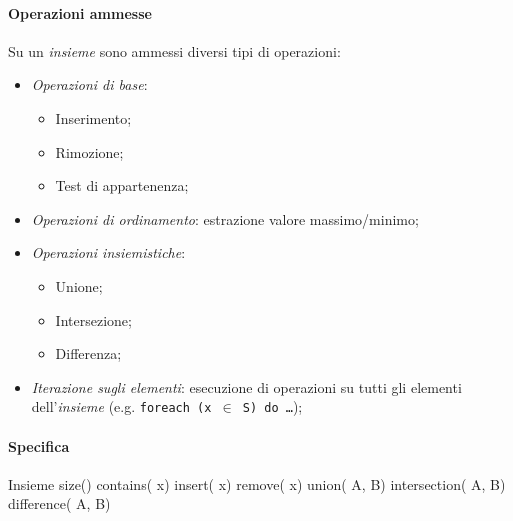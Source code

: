 \paragraph{Operazioni ammesse}
Su un \emph{insieme} sono ammessi diversi tipi di operazioni:
\begin{itemize}
    \item \emph{Operazioni di base}:
    \begin{itemize}
        \item Inserimento;
        \item Rimozione;
        \item Test di appartenenza;
    \end{itemize}
    \item \emph{Operazioni di ordinamento}: estrazione valore massimo/minimo;
    \item \emph{Operazioni insiemistiche}:
        \begin{itemize}
            \item Unione;
            \item Intersezione;
            \item Differenza;
        \end{itemize}
    \item \emph{Iterazione sugli elementi}: esecuzione di operazioni su tutti
    gli elementi dell'\emph{insieme} (e.g. \texttt{foreach (x $\in$ S) do \dots});
\end{itemize}

\paragraph{Specifica}
\begin{code}{Insieme}
     size()
    \nl{}
     contains( x)
    \nl{}
    insert( x)
    \nl{}
    remove( x)
    \nl{}
     union( A,  B)
    \nl{}
     intersection( A,  B)
    \nl{}
     difference( A,  B)
\end{code}

